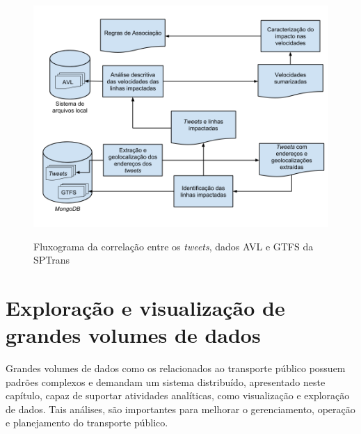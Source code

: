 \documentclass[
	12pt,				%
	oneside,			%
	a4paper,			%
	english,			%
	brazil				%
	]{abntex2ppgsi}
\begin{document}
{{{\begin{figure}[H]%
	\centering
 	  \caption{Fluxograma da correlação entre os \textit{tweets}, dados AVL e GTFS da SPTrans}
		\includegraphics[width=1\linewidth]{images/caracterization_flow.png}
	\label{fig:caracterization_flow}
\end{figure}



\chapter{Exploração e visualização de grandes volumes de dados}
\label{dataViz}

Grandes volumes de dados como os relacionados ao transporte público possuem padrões complexos e demandam um sistema distribuído, apresentado neste capítulo, capaz de suportar atividades analíticas, como visualização e exploração de dados. Tais análises, são importantes para melhorar o gerenciamento, operação e planejamento do transporte público.

}}}
\end{document}
